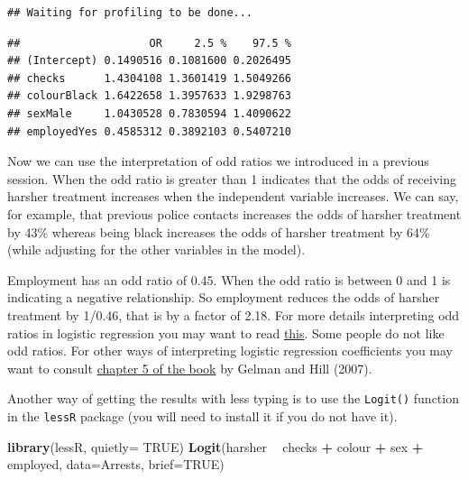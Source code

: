\documentclass[]{book}
\newenvironment{Shaded}{\begin{snugshade}}{\end{snugshade}}
\newcommand{\DataTypeTok}[1]{\textcolor[rgb]{0.13,0.29,0.53}{#1}}
\newcommand{\KeywordTok}[1]{\textcolor[rgb]{0.13,0.29,0.53}{\textbf{#1}}}
\newcommand{\NormalTok}[1]{#1}
\newcommand{\OperatorTok}[1]{\textcolor[rgb]{0.81,0.36,0.00}{\textbf{#1}}}
\newcommand{\OtherTok}[1]{\textcolor[rgb]{0.56,0.35,0.01}{#1}}
\newcommand{\StringTok}[1]{\textcolor[rgb]{0.31,0.60,0.02}{#1}}
\theoremstyle{definition}
\theoremstyle{definition}
\theoremstyle{definition}
\theoremstyle{remark}
\begin{document}
\begin{verbatim}
## Waiting for profiling to be done...
\end{verbatim}

\begin{verbatim}
##                    OR     2.5 %    97.5 %
## (Intercept) 0.1490516 0.1081600 0.2026495
## checks      1.4304108 1.3601419 1.5049266
## colourBlack 1.6422658 1.3957633 1.9298763
## sexMale     1.0430528 0.7830594 1.4090622
## employedYes 0.4585312 0.3892103 0.5407210
\end{verbatim}

Now we can use the interpretation of odd ratios we introduced in a
previous session. When the odd ratio is greater than 1 indicates that
the odds of receiving harsher treatment increases when the independent
variable increases. We can say, for example, that previous police
contacts increases the odds of harsher treatment by 43\% whereas being
black increases the odds of harsher treatment by 64\% (while adjusting
for the other variables in the model).

Employment has an odd ratio of 0.45. When the odd ratio is between 0 and
1 is indicating a negative relationship. So employment reduces the odds
of harsher treatment by 1/0.46, that is by a factor of 2.18. For more
details interpreting odd ratios in logistic regression you may want to
read
\href{http://www.ats.ucla.edu/stat/mult_pkg/faq/general/odds_ratio.htm}{this}.
Some people do not like odd ratios. For other ways of interpreting
logistic regression coefficients you may want to consult
\href{http://www.cambridge.org/gb/academic/subjects/statistics-probability/statistical-theory-and-methods/data-analysis-using-regression-and-multilevelhierarchical-models?format=PB}{chapter
5 of the book} by Gelman and Hill (2007).

Another way of getting the results with less typing is to use the
\texttt{Logit()} function in the \texttt{lessR} package (you will need
to install it if you do not have it).

\begin{Shaded}
\begin{Highlighting}[]
\KeywordTok{library}\NormalTok{(lessR, }\DataTypeTok{quietly=} \OtherTok{TRUE}\NormalTok{)}
\KeywordTok{Logit}\NormalTok{(harsher }\OperatorTok{~}\StringTok{ }\NormalTok{checks }\OperatorTok{+}\StringTok{ }\NormalTok{colour }\OperatorTok{+}\StringTok{ }\NormalTok{sex }\OperatorTok{+}\StringTok{ }\NormalTok{employed, }\DataTypeTok{data=}\NormalTok{Arrests, }\DataTypeTok{brief=}\OtherTok{TRUE}\NormalTok{)}
\end{Highlighting}
\end{Shaded}
\end{document}

